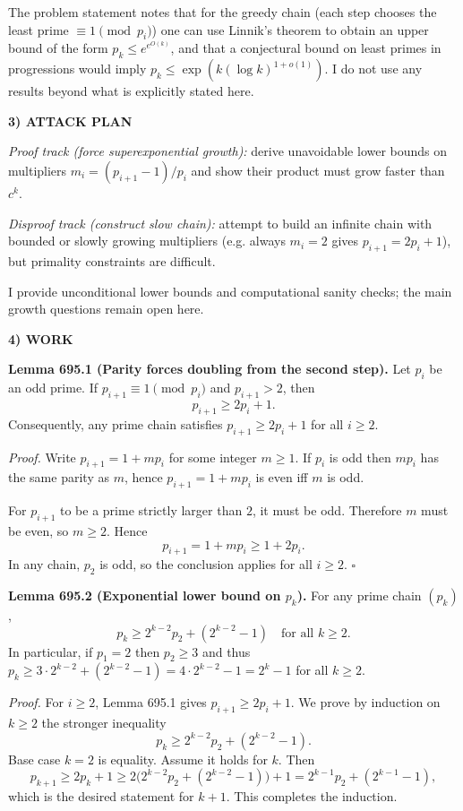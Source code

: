 The problem statement notes that for the greedy chain (each step chooses the least prime $\equiv 1\pmod{p_i}$) one can use Linnik's theorem to obtain an upper bound of the form $p_k\le e^{e^{O(k)}}$, and that a conjectural bound on least primes in progressions would imply $p_k\le \exp(k(\log k)^{1+o(1)})$. I do not use any results beyond what is explicitly stated here.

\bigskip
\noindent\textbf{3) ATTACK PLAN}

\emph{Proof track (force superexponential growth):} derive unavoidable lower bounds on multipliers $m_i=(p_{i+1}-1)/p_i$ and show their product must grow faster than $c^k$.

\emph{Disproof track (construct slow chain):} attempt to build an infinite chain with bounded or slowly growing multipliers (e.g. always $m_i=2$ gives $p_{i+1}=2p_i+1$), but primality constraints are difficult.

I provide unconditional lower bounds and computational sanity checks; the main growth questions remain open here.

\bigskip
\noindent\textbf{4) WORK}

\noindent\textbf{Lemma 695.1 (Parity forces doubling from the second step).}
Let $p_i$ be an odd prime. If $p_{i+1}\equiv 1\pmod{p_i}$ and $p_{i+1}>2$, then
\[
 p_{i+1}\ge 2p_i+1.
\]
Consequently, any prime chain satisfies $p_{i+1}\ge 2p_i+1$ for all $i\ge 2$.

\smallskip
\noindent\emph{Proof.}
Write $p_{i+1}=1+m p_i$ for some integer $m\ge 1$. If $p_i$ is odd then $m p_i$ has the same parity as $m$, hence $p_{i+1}=1+m p_i$ is even iff $m$ is odd.

For $p_{i+1}$ to be a prime strictly larger than $2$, it must be odd. Therefore $m$ must be even, so $m\ge 2$. Hence
\[
 p_{i+1}=1+m p_i\ge 1+2p_i.
\]
In any chain, $p_2$ is odd, so the conclusion applies for all $i\ge 2$. \hfill$\square$

\medskip
\noindent\textbf{Lemma 695.2 (Exponential lower bound on $p_k$).}
For any prime chain $(p_k)$,
\[
 p_k\ge 2^{k-2}p_2 + (2^{k-2}-1)\quad\text{for all }k\ge 2.
\]
In particular, if $p_1=2$ then $p_2\ge 3$ and thus $p_k\ge 3\cdot 2^{k-2}+ (2^{k-2}-1)=4\cdot 2^{k-2}-1=2^{k}-1$ for all $k\ge 2$.

\smallskip
\noindent\emph{Proof.}
For $i\ge 2$, Lemma 695.1 gives $p_{i+1}\ge 2p_i+1$. We prove by induction on $k\ge 2$ the stronger inequality
\[
 p_k\ge 2^{k-2}p_2 + (2^{k-2}-1).
\]
Base case $k=2$ is equality.
Assume it holds for $k$. Then
\[
 p_{k+1}\ge 2p_k+1\ge 2\big(2^{k-2}p_2 + (2^{k-2}-1)\big)+1=2^{k-1}p_2+(2^{k-1}-1),
\]
which is the desired statement for $k+1$. This completes the induction.


